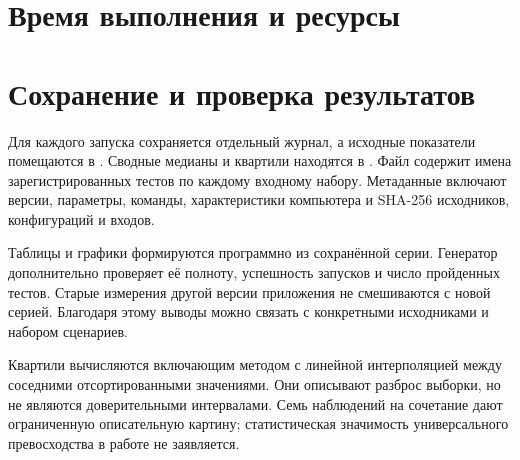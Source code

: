 \section{Время выполнения и ресурсы}


\section{Сохранение и проверка результатов}
Для каждого запуска сохраняется отдельный журнал, а исходные показатели помещаются в . Сводные медианы и квартили находятся в . Файл  содержит имена зарегистрированных тестов по каждому входному набору. Метаданные включают версии, параметры, команды, характеристики компьютера и SHA-256 исходников, конфигураций и входов.

Таблицы и графики формируются программно из сохранённой серии. Генератор дополнительно проверяет её полноту, успешность запусков и число пройденных тестов. Старые измерения другой версии приложения не смешиваются с новой серией. Благодаря этому выводы можно связать с конкретными исходниками и набором сценариев.

Квартили вычисляются включающим методом с линейной интерполяцией между соседними отсортированными значениями. Они описывают разброс выборки, но не являются доверительными интервалами. Семь наблюдений на сочетание дают ограниченную описательную картину; статистическая значимость универсального превосходства в работе не заявляется.
